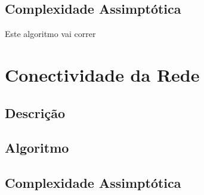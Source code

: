 \documentclass[12pt,a4paper]{scrartcl}
\begin{document}
\subsection{Complexidade Assimptótica}

Este algoritmo vai correr

\section{Conectividade da Rede}

\subsection{Descrição}

\subsection{Algoritmo}

\subsection{Complexidade Assimptótica}
\end{document}
